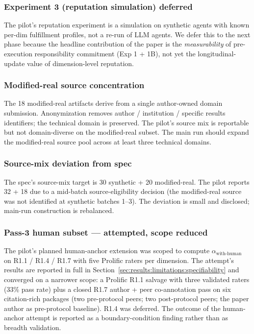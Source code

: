 \subsubsection{Experiment 3 (reputation simulation) deferred}
The pilot's reputation experiment is a simulation on synthetic agents with known per-dim fulfillment profiles, not a re-run of LLM agents. We defer this to the next phase because the headline contribution of the paper is the \emph{measurability} of pre-execution responsibility commitment (Exp 1 + 1B), not yet the longitudinal-update value of dimension-level reputation.

\subsubsection{Modified-real source concentration}
The 18 modified-real artifacts derive from a single author-owned domain submission. Anonymization removes author / institution / specific results identifiers; the technical domain is preserved. The pilot's source mix is reportable but not domain-diverse on the modified-real subset. The main run should expand the modified-real source pool across at least three technical domains.

\subsubsection{Source-mix deviation from spec}
The spec's source-mix target is 30 synthetic + 20 modified-real. The pilot reports 32 + 18 due to a mid-batch source-eligibility decision (the modified-real source was not identified at synthetic batches 1--3). The deviation is small and disclosed; main-run construction is rebalanced.

\subsubsection{Pass-3 human subset --- attempted, scope reduced}
The pilot's planned human-anchor extension was scoped to compute $\alpha_{\text{with-human}}$ on R1.1 / R1.4 / R1.7 with five Prolific raters per dimension. The attempt's results are reported in full in Section~\ref{sec:results:limitations:specifiability} and converged on a narrower scope: a Prolific R1.1 salvage with three validated raters (33\% pass rate) plus a closed R1.7 author + peer co-annotation pass on six citation-rich packages (two pre-protocol peers; two post-protocol peers; the paper author as pre-protocol baseline). R1.4 was deferred. The outcome of the human-anchor attempt is reported as a boundary-condition finding rather than as breadth validation.

